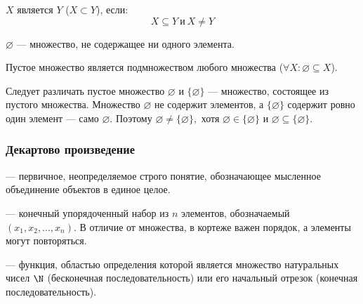 \begin{definition}
    \(X\) является  \(Y\) (\(X \subset Y\)), если:
    \[
        X \subseteq Y \ \text{и} \ X \neq Y
    \]
\end{definition}

\begin{definition}
     \(\varnothing\) --- множество, не содержащее ни одного элемента.
\end{definition}

\begin{remark}
    Пустое множество является подмножеством любого множества (\(\forall X : \varnothing \subseteq X\)).
\end{remark}

\begin{remark}
    Следует различать пустое множество \(\varnothing\) и \(\{\varnothing\}\) --- множество, состоящее из
    пустого множества. Множество \(\varnothing\) не содержит элементов, а \(\{\varnothing\}\) содержит
    ровно один элемент --- само \(\varnothing\). Поэтому \(\varnothing \neq \{\varnothing\},\) хотя \(\varnothing \in \{\varnothing\}\) и \(\varnothing \subseteq \{\varnothing\}\).
\end{remark}


\subsubsection{Декартово произведение}

\begin{definition}
     --- первичное, неопределяемое строго понятие, обозначающее
    мысленное объединение объектов в единое целое. 
\end{definition}

\begin{definition}
     --- конечный упорядоченный набор из \(n\) элементов,
    обозначаемый \((x_1, x_2, \dots, x_n)\). В отличие от множества, в кортеже
    важен порядок, а элементы могут повторяться.
\end{definition}

\begin{definition}
     --- функция, областью определения которой
    является множество натуральных чисел \(\N\) (бесконечная последовательность)
    или его начальный отрезок (конечная последовательность).
\end{definition}

